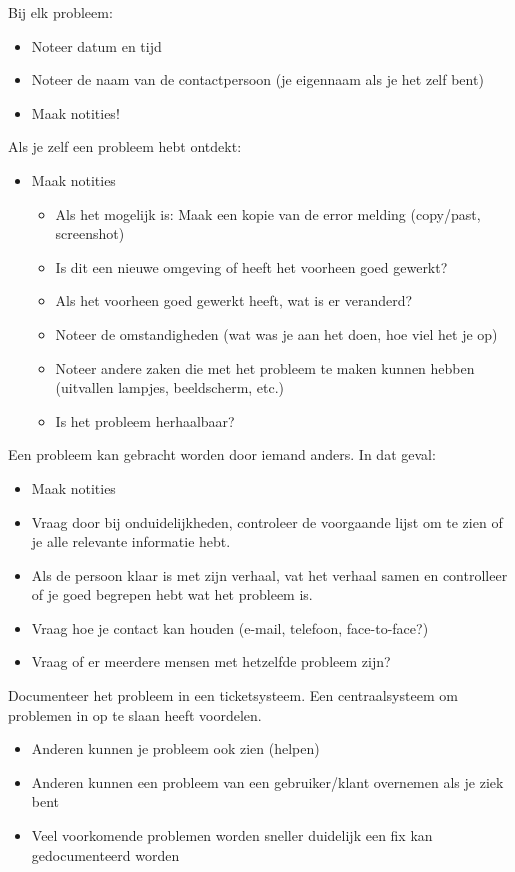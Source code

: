 Bij elk probleem:
\begin{itemize}
	\item Noteer datum en tijd
	\item Noteer de naam van de contactpersoon (je eigennaam als je het zelf bent)
	\item Maak notities!
\end{itemize}

Als je zelf een probleem hebt ontdekt:
\begin{itemize}
\item Maak notities
	\begin{itemize}
	\item Als het mogelijk is: Maak een kopie van de error melding (copy/past, screenshot)
	\item Is dit een nieuwe omgeving of heeft het voorheen goed gewerkt?
	\item Als het voorheen goed gewerkt heeft, wat is er veranderd?
	\item Noteer de omstandigheden (wat was je aan het doen, hoe viel het je op)
	\item Noteer andere zaken die met het probleem te maken kunnen hebben (uitvallen lampjes, beeldscherm, etc.)
	\item Is het probleem herhaalbaar?
	\end{itemize}
\end{itemize}

Een probleem kan gebracht worden door iemand anders. In dat geval:
\begin{itemize}
	\item Maak notities
	\item Vraag door bij onduidelijkheden, controleer de voorgaande lijst om te zien of je alle relevante informatie hebt.
	\item Als de persoon klaar is met zijn verhaal, vat het verhaal samen en controlleer of je goed begrepen hebt wat het probleem is.
	\item Vraag hoe je contact kan houden (e-mail, telefoon, face-to-face?)
	\item Vraag of er meerdere mensen met hetzelfde probleem zijn?
\end{itemize}

Documenteer het probleem in een ticketsysteem. Een centraalsysteem om problemen in op te slaan heeft voordelen.
\begin{itemize}
	\item Anderen kunnen je probleem ook zien (helpen)
	\item Anderen kunnen een probleem van een gebruiker/klant overnemen als je ziek bent
	\item Veel voorkomende problemen worden sneller duidelijk een fix kan gedocumenteerd worden
\end{itemize}
